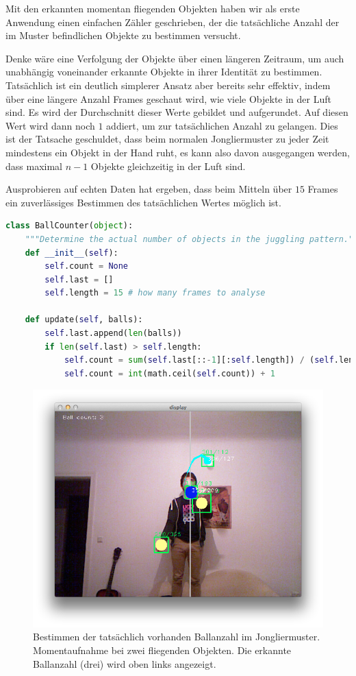 \documentclass[12pt,a4paper,ngerman]{scrartcl}
\begin{document}
Mit den erkannten momentan fliegenden Objekten haben wir als erste Anwendung einen
einfachen Zähler geschrieben, der die tatsächliche Anzahl der im Muster befindlichen Objekte zu bestimmen versucht.

Denke wäre eine Verfolgung der Objekte über einen längeren Zeitraum, um auch
unabhängig voneinander erkannte Objekte in ihrer Identität zu bestimmen. Tatsächlich
ist ein deutlich simplerer Ansatz aber bereits sehr effektiv, indem über eine
längere Anzahl Frames geschaut wird, wie viele Objekte in der Luft sind. Es wird der
Durchschnitt dieser Werte gebildet und aufgerundet. Auf diesen Wert wird dann noch
$1$ addiert, um zur tatsächlichen Anzahl zu gelangen. Dies ist der Tatsache
geschuldet, dass beim normalen Jongliermuster zu jeder Zeit mindestens ein Objekt in der Hand ruht, es kann also davon ausgegangen werden, dass maximal $n - 1$ Objekte
gleichzeitig in der Luft sind.

Ausprobieren auf echten Daten hat ergeben, dass beim Mitteln über $15$ Frames
ein zuverlässiges Bestimmen des tatsächlichen Wertes möglich ist.

\begin{lstlisting}[language=Python]
class BallCounter(object):
    """Determine the actual number of objects in the juggling pattern."""
    def __init__(self):
        self.count = None
        self.last = []
        self.length = 15 # how many frames to analyse

    def update(self, balls):
        self.last.append(len(balls))
        if len(self.last) > self.length:
            self.count = sum(self.last[::-1][:self.length]) / (self.length*1.0)
            self.count = int(math.ceil(self.count)) + 1
\end{lstlisting}


\begin{figure}[H]
    \centering
    \includegraphics[scale=0.5]{img/ballcount-1.png}
    \vspace{-0.5cm}
    \caption{Bestimmen der tatsächlich vorhanden Ballanzahl im Jongliermuster. Momentaufnahme bei zwei fliegenden Objekten. Die erkannte Ballanzahl (drei) wird oben links angezeigt.}
    \label{ballcount-1}
\end{figure}
\end{document}
